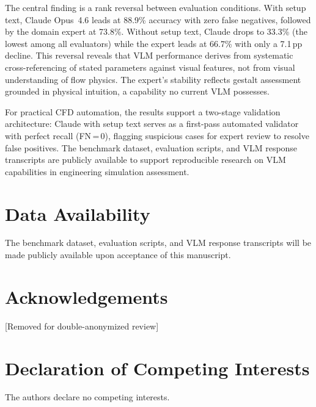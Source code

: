 \documentclass[preprint,12pt]{elsarticle}
\begin{document}
The central finding is a rank reversal between evaluation conditions. With
setup text, Claude Opus~4.6 leads at 88.9\% accuracy with zero false
negatives, followed by the domain expert at 73.8\%. Without setup text,
Claude drops to 33.3\% (the lowest among all evaluators) while the expert
leads at 66.7\% with only a 7.1\,pp decline. This reversal reveals that VLM
performance derives from systematic cross-referencing of stated parameters
against visual features, not from visual understanding of flow physics. The
expert's stability reflects gestalt assessment grounded in physical
intuition, a capability no current VLM possesses.

For practical CFD automation, the results support a two-stage validation
architecture: Claude with setup text serves as a first-pass automated
validator with perfect recall (FN\,=\,0), flagging suspicious cases for
expert review to resolve false positives. The benchmark dataset, evaluation
scripts, and VLM response transcripts are publicly available to support
reproducible research on VLM capabilities in engineering simulation
assessment.


\section*{Data Availability}

The benchmark dataset, evaluation scripts, and VLM response transcripts
will be made publicly available upon acceptance of this manuscript.


\section*{Acknowledgements}

[Removed for double-anonymized review]

\section*{Declaration of Competing Interests}

The authors declare no competing interests.




\end{document}

